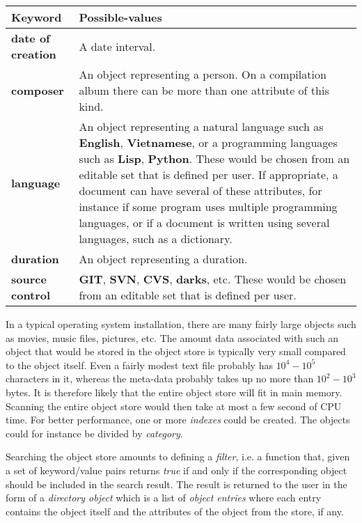\begin{tabularx}{\linewidth}%
{|>{\setlength\hsize{.2\hsize}}X|%
  >{\setlength\hsize{.8\hsize}}X|}
\hline
Keyword & Possible-values\\
\hline\hline
\textbf{date of creation} &

A date interval.\\
\hline
\textbf{composer} &

An object representing a person.  On a compilation album there
can be more than one attribute of this kind. \\
\hline
\textbf{language} &

An object representing a natural language such
as \textbf{English}, \textbf{Vietnamese}, or a programming languages
such as \textbf{Lisp}, \textbf{Python}. These would
be chosen from an editable set that is defined per user.  If
appropriate, a document can have several of these attributes, for
instance if some program uses multiple programming languages, or
if a document is written using several languages, such as a
dictionary. \\
\hline
\textbf{duration} &

An object representing a duration. \\
\hline
\textbf{source control} &
 
\textbf{GIT}, \textbf{SVN}, \textbf{CVS}, \textbf{darks}, etc.  These
would be chosen from an editable set that is defined per user.\\
\hline
\end{tabularx}

In a typical operating system installation, there are many fairly
large objects such as movies, music files, pictures, etc.  The amount
data associated with such an object that would be stored in the object
store is typically very small compared to the object itself.  Even a
fairly modest text file probably has $10^4 - 10^5$ characters in it,
whereas the meta-data probably takes up no more than $10^2 - 10^3$
bytes.  It is therefore likely that the entire object store will fit
in main memory.  Scanning the entire object store would then take at
most a few second of CPU time.  For better performance, one or more
\emph{indexes} could be created.  The objects could for instance be
divided by \emph{category}.

Searching the object store amounts to defining a \emph{filter},
i.e. a function that, given a set of keyword/value pairs returns
\emph{true} if and only if the corresponding object should be included
in the search result.  The result is returned to the user in the form
of a \emph{directory object} which is a list of \emph{object entries}
where each entry contains the object itself and the attributes of the
object from the store, if any.

